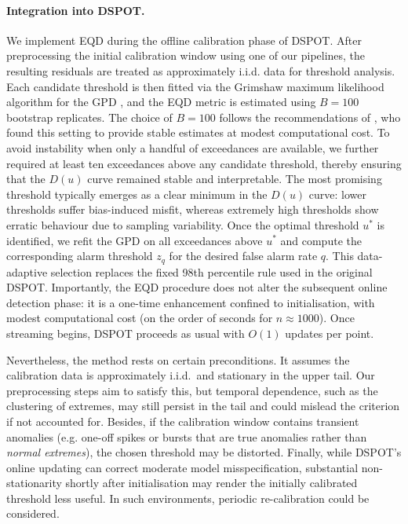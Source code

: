 \documentclass{statsmsc}
\begin{document}
\paragraph{Integration into DSPOT.} 
We implement EQD during the offline calibration phase of DSPOT. 
After preprocessing the initial calibration window using one of our pipelines, 
the resulting residuals are treated as approximately i.i.d. data for threshold analysis. 
Each candidate threshold is then fitted via the Grimshaw maximum likelihood algorithm for the GPD 
\citep{grimshaw1993computing}, and the EQD metric is estimated using $B=100$ bootstrap replicates. 
The choice of $B=100$ follows the recommendations of \citet{murphy2025eqd}, who found this setting to 
provide stable estimates at modest computational cost. To avoid instability when only a handful of exceedances are available, 
we further required at least ten exceedances above any candidate threshold, thereby ensuring that 
the $D(u)$ curve remained stable and interpretable. The most promising threshold typically emerges 
as a clear minimum in the $D(u)$ curve: lower thresholds suffer bias-induced misfit, 
whereas extremely high thresholds show erratic behaviour due to sampling variability. 
Once the optimal threshold $u^*$ is identified, we refit the GPD on all exceedances above $u^*$ 
and compute the corresponding alarm threshold $z_q$ for the desired false alarm rate $q$. 
This data-adaptive selection replaces the fixed 98th percentile rule used in the original DSPOT. 
Importantly, the EQD procedure does not alter the subsequent online detection phase: 
it is a one-time enhancement confined to initialisation, with modest computational cost 
(on the order of seconds for $n \approx 1000$). Once streaming begins, DSPOT proceeds as usual with $O(1)$ updates per point.

Nevertheless, the method rests on certain preconditions. It assumes the calibration data is approximately 
i.i.d.\ and stationary in the upper tail. Our preprocessing steps aim to satisfy this, but temporal dependence, 
such as the clustering of extremes, may still persist in the tail and could mislead the criterion if not accounted for. 
Besides, if the calibration window contains transient anomalies (e.g. one-off spikes or bursts that are true anomalies 
rather than \emph{normal extremes}), the chosen threshold may be distorted. Finally, while DSPOT's online updating can 
correct moderate model misspecification, substantial non-stationarity shortly after initialisation 
may render the initially calibrated threshold less useful. 
In such environments, periodic re-calibration could be considered.
\end{document}
